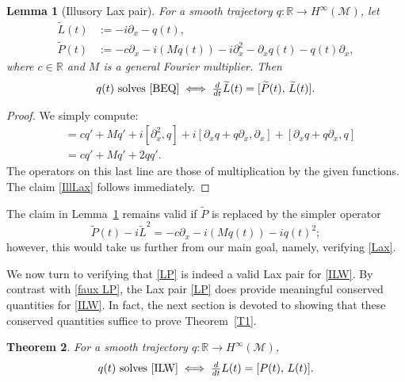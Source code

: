 \documentclass{amsart}
\newcommand{\R}{{\mathbb{R}}}
\newtheorem{theorem}{Theorem}[section]
\newtheorem{lemma}[theorem]{Lemma}
\theoremstyle{definition}
\theoremstyle{remark}
\begin{document}
\begin{lemma}[Illusory Lax pair]\label{L:IllLP}
For a smooth trajectory $q:\R\to H^\infty(\mathcal M)$, let
\begin{equation}\label{faux LP}\begin{aligned}
\widetilde L(t) &:= -i\partial_x  - q(t), \\
\widetilde P(t) &:= -c \partial_x - i(Mq(t)) - i \partial_x^2   - \partial_x q(t) - q(t)\partial_x,
\end{aligned}\end{equation}
where $c\in \R$ and $M$ is a general Fourier multiplier.  Then
\begin{align}
\text{$q(t)$ solves \eqref{BEQ}} \iff \tfrac{d}{dt} \widetilde L(t) = [\widetilde P(t),\, \widetilde L(t)].    \label{IllLax}    
\end{align}
\end{lemma}

\begin{proof} We simply compute:
\begin{align*}
[\widetilde P,\, \widetilde L] &= c q'  + Mq' + i [\partial_x^2,q]  + i[\partial_x q + q \partial_x, \partial_x] + [\partial_x q + q \partial_x,q] \\
&= c q'  + Mq' + 2qq' .
\end{align*}
The operators on this last line are those of multiplication by the given functions.  The claim \eqref{IllLax} follows immediately.
\end{proof}

The claim in Lemma~\ref{L:IllLP} remains valid if $\widetilde P$ is replaced by the simpler operator
$$
\widetilde P(t)  - i \tilde L^2 = -c \partial_x - i(Mq(t)) - i q(t)^2;
$$
however, this would take us further from our main goal, namely, verifying \eqref{Lax}.

We now turn to verifying that \eqref{LP} is indeed a valid Lax pair for \eqref{ILW}.  By contrast with \eqref{faux LP}, the Lax pair \eqref{LP} does provide meaningful conserved quantities for \eqref{ILW}.  In fact, the next section is devoted to showing that these conserved quantities suffice to prove Theorem~\ref{T1}.  

\begin{theorem}\label{T:Lax}  For a smooth trajectory $q:\R\to H^\infty(\mathcal M)$,
\begin{align}
\text{$q(t)$ solves \eqref{ILW}} \iff \tfrac{d}{dt} L(t) = [P(t),\, L(t) ].    \label{Lax'}    
\end{align}
\end{theorem}
\end{document}
